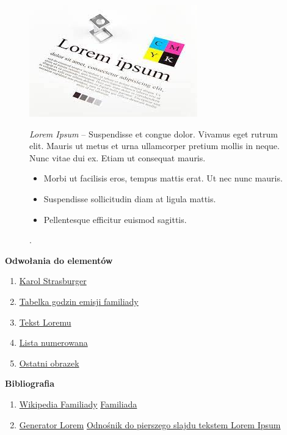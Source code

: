 \documentclass{beamer}
\begin{document}
\begin{frame}[label=TekstLorem]

\begin{figure}[htp]
\begin{minipage}{0.33\textwidth}
\centering
\includegraphics[width=\textwidth]{foto4.jpeg}
\end{minipage}
\begin{minipage}{0.66\textwidth}
\centering
\textit{Lorem Ipsum} – Suspendisse et congue dolor. Vivamus eget rutrum elit. Mauris ut metus et urna ullamcorper pretium mollis in 
neque. Nunc vitae dui ex. Etiam ut consequat mauris. \begin{itemize}
    \item Morbi ut facilisis eros, tempus mattis erat. Ut nec nunc mauris.
    \item Suspendisse sollicitudin diam at ligula mattis.
    \item Pellentesque efficitur euismod sagittis.
\end{itemize}.
\end{minipage}
\end{figure}

\end{frame}
\begin{frame}

\textbf{Odwołania do elementów}
\begin{enumerate}
\item \hyperlink{Karol}{Karol Strasburger}
\item \hyperlink{Tabela}{Tabelka godzin emisji familiady}
\item \hyperlink{StartLoremu}{Tekst Loremu}
\item \hyperlink{Listaloremów}{Lista numerowana}
\item \hyperlink{TekstLorem}{Ostatni obrazek}
\end{enumerate}
\textbf{Bibliografia}
\begin{enumerate}
    \item \hyperlink{https://pl.wikipedia.org/wiki/Familiada}{Wikipedia Familiady} \hyperlink{Odnośnik do foto Strasburgera}{Familiada}
    \item \hyperlink{https://www.lipsum.com/feed/html}{Generator Lorem} \hyperlink{StartLoremu}{Odnośnik do pierszego slajdu tekstem 
Lorem Ipsum}
\end{enumerate}
\end{frame}
\end{document}
